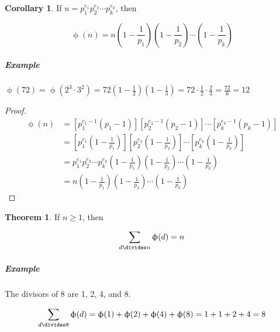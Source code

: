 \documentclass{article}
\theoremstyle{definition} %
\newtheorem{theorem}{Theorem}[section] %
\theoremstyle{definition}
\newtheorem{corollary}{Corollary}[section] %
\theoremstyle{definition}
\newcommand{\tot}{\upphi}
\theoremstyle{definition}
\begin{document}
  \begin{corollary}
    If $n = p_1^{e_1} p_2^{e_2} \cdots p_k^{e_k}$, then
    
    \[ \tot(n) = n\left( 1 - \frac{1}{p_1}\right) \left(1 - \frac{1}{p_2}\right)\cdots\left(1 - \frac{1}{p_k}\right) \]
  \end{corollary}
  
  \subparagraph{Example} $\tot(72) = \tot(2^3 \cdot 3^2) = 72(1 - \frac{1}{2})(1 - \frac{1}{3}) = 72\cdot\frac{1}{2}\cdot\frac{2}{3}
  = \frac{72}{6} = 12$
  
  \begin{proof}
    \begin{align*}
      \tot(n) &= \left[p_1^{e_1-1}(p_1-1)\right] \left[p_2^{e_2-1}(p_2-1)\right] \cdots \left[p_k^{e_k-1}(p_k-1)\right] \\
        &= \left[p_1^{e_1}\left(1-\frac{1}{p_1}\right)\right] \left[p_2^{e_2}\left(1-\frac{1}{p_2}\right)\right] \cdots \left[p_k^{e_k}\left(1-\frac{1}{p_k}\right)\right] \\
        &= p_1^{e_1} p_2^{e_2} \cdots p_k^{e_k} \left( 1 - \frac{1}{p_1}\right) \left(1 - \frac{1}{p_2}\right)\cdots\left(1 - \frac{1}{p_k}\right) \\
        &= n\left( 1 - \frac{1}{p_1}\right) \left(1 - \frac{1}{p_2}\right)\cdots\left(1 - \frac{1}{p_k}\right)
    \end{align*}
  \end{proof}
  
  \begin{theorem}
    If $n \geq 1$, then
    
    \[ \sum_{d \divides n}\tot(d) = n \]
  \end{theorem}
  
  \subparagraph{Example} The divisors of 8 are 1, 2, 4, and 8.
  
  \[ \sum_{d \divides 8}\tot(d) = \tot(1) + \tot(2) + \tot(4) + \tot(8) = 1 + 1 + 2 + 4 = 8 \]
  
\end{document}
